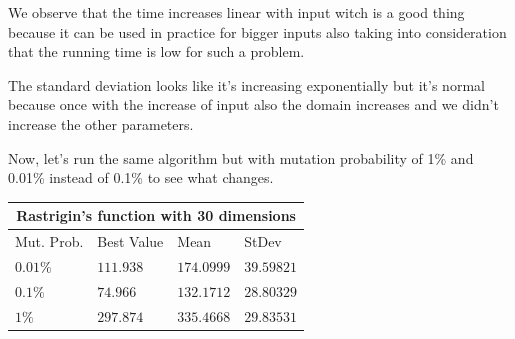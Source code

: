 \documentclass[12pt,leqno]{article}
\begin{document}
  We observe that the time increases linear with input witch is a good thing because it can be used in practice for bigger inputs also taking into consideration that the running time is low for such a problem.
  
\begin{center}
\end{center}

  The standard deviation looks like it's increasing exponentially but it's normal because once with the increase of input also the domain increases and we didn't increase the other parameters.

\newpage

Now, let's run the same algorithm but with mutation probability of 1\% and 0.01\% instead of 0.1\% to see what changes. 

\begin{center}
  \begin{tabular}{|p{2.3cm}||p{3cm}|p{2cm}|p{2cm}|} 
    \hline
    \multicolumn{4}{|c|}{Rastrigin's function with 30 dimensions} \\
    \hline
    Mut. Prob.    & Best Value & Mean & StDev \\ 
    \hline\hline
    $ 0.01\% $ & $ 111.938 $ & $ 174.0999 $ & $ 39.59821 $ \\ 
    \hline
    $ 0.1\%  $ & $ 74.966 $ & $ 132.1712 $ & $ 28.80329 $ \\ 
    \hline
    $ 1\%    $ & $ 297.874 $ & $ 335.4668 $ & $ 29.83531 $ \\ 
    \hline
 \end{tabular}
\end{center}
\end{document}
